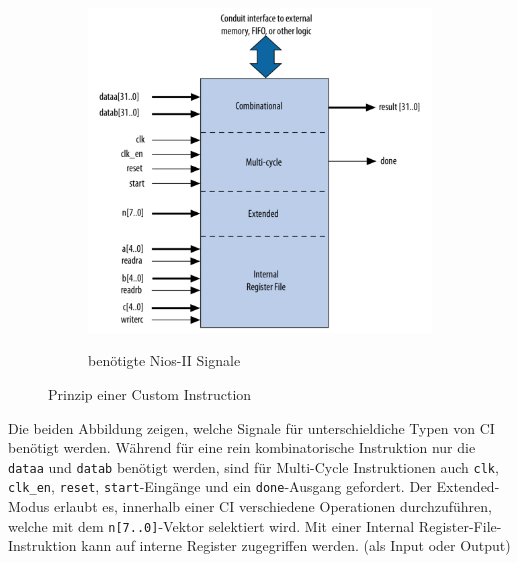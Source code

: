 \documentclass[11pt,a4paper,oneside]{scrartcl}
\def\code#1{\texttt{#1}}
\begin{document}
\begin{figure}[ht!]
\begin{subfigure}[b]{0.4\textwidth}
{      \includegraphics[height=.3\textheight]{pic/custom_instruction_signals.png}}
\caption{benötigte Nios-II Signale}
 \end{subfigure}
 \caption{Prinzip einer Custom Instruction}
\end{figure}
Die beiden Abbildung zeigen, welche Signale für unterschieldiche Typen von CI benötigt werden. 
Während für eine rein kombinatorische Instruktion nur die \code{dataa} und \code{datab} benötigt werden, sind für Multi-Cycle Instruktionen auch \code{clk}, \code{clk\_en}, \code{reset}, \code{start}-Eingänge und ein \code{done}-Ausgang gefordert. Der Extended-Modus erlaubt es, innerhalb einer CI verschiedene Operationen durchzuführen, welche mit dem \code{n[7..0]}-Vektor selektiert wird. Mit einer Internal Register-File-Instruktion kann auf interne Register zugegriffen werden. (als Input oder Output)
\end{document}
